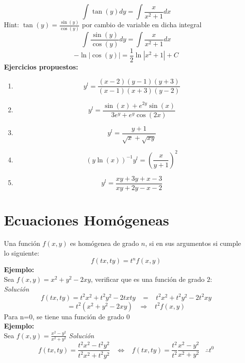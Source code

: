 \documentclass[10pt,executivepaper]{article}
\begin{document}
\[\int \tan(y)dy=\int\frac{x}{x^{2}+1}dx\]
Hint: $\tan(y)=\frac{\sin(y)}{\cos(y)}$ por cambio de variable en dicha integral
\[\int\frac{\sin(y)}{\cos(y)}dy=\int\frac{x}{x^{2}+1}dx\]
\[-\ln\left|\cos(y)\right|=\frac{1}{2}\ln\left|x^{2}+1\right|+C\]
\clearpage
\textbf{Ejercicios propuestos:}
\begin{enumerate}
  \item \[y^{l}=\frac{(x-2)(y-1)(y+3)}{(x-1)(x+3)(y-2)}\]
  \item \[y^{l}=\frac{\sin(x)+e^{2y}\sin(x)}{3e^{y}+e^{y}\cos(2x)}\]
  \item \[y^{l}=\frac{y+1}{\sqrt{x}+\sqrt{xy}}\]
  \item \[\left(y\ln(x)\right)^{-1}y^{l}=\left(\frac{x}{y+1}\right)^{2}\]
  \item \[y^{l}=\frac{xy+3y+x-3}{xy+2y-x-2}\]
\end{enumerate}

\section{Ecuaciones Homógeneas}
Una función $f(x,y)$ es homógenea de grado $n$, si en sus argumentos si cumple lo siguiente:\\
\[f(tx,ty)=t^{n}f(x,y)\]
\textbf{Ejemplo:}
\\Sea $f(x,y)=x^{2}+y^{2}-2xy$, verificar que es una función de grado $2$:\\
\textit{Solución}
\[f(tx,ty)=t^{2}x^{2}+t^{2}y^{2}-2txty\;\;\;=\;\;\;t^{2}x^{2}+t^{2}y^{2}-2t^{2}xy\]
\[=t^{2}(x^{2}+y^{2}-2xy)\;\;\;\Rightarrow\;\;\;t^{2}f(x,y)\]
Para n=0, se tiene una función de grado $0$\\
\textbf{Ejemplo:}\\
Sea $f(x,y)=\frac{x^{2}-y^{2}}{x^{2}+y^{2}}$
\textit{Solución}
\[f(tx,ty)=\frac{t^{2}x^{2}-t^{2}y^{2}}{t^{2}x^{2}+t^{2}y^{2}}\;\;\;\Leftrightarrow\;\;\;f(tx,ty)=\frac{t^{2}}{t^{2}}\frac{x^{2}-y^{2}}{x^{2}+y^{2}}\;\;\;\therefore t^{0}\]
\clearpage
\end{document}
